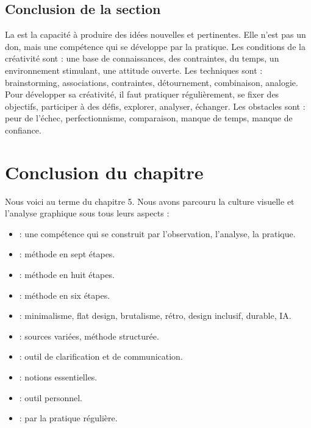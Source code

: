 \subsection*{Conclusion de la section}

\begin{retenir}
La  est la capacité à produire des idées nouvelles et pertinentes. Elle n'est pas un don, mais une compétence qui se développe par la pratique. Les conditions de la créativité sont : une base de connaissances, des contraintes, du temps, un environnement stimulant, une attitude ouverte. Les techniques sont : brainstorming, associations, contraintes, détournement, combinaison, analogie. Pour développer sa créativité, il faut pratiquer régulièrement, se fixer des objectifs, participer à des défis, explorer, analyser, échanger. Les obstacles sont : peur de l'échec, perfectionnisme, comparaison, manque de temps, manque de confiance.
\end{retenir}

\section*{Conclusion du chapitre}

Nous voici au terme du chapitre 5. Nous avons parcouru la culture visuelle et l'analyse graphique sous tous leurs aspects :

\begin{itemize}
    \item {} : une compétence qui se construit par l'observation, l'analyse, la pratique.
    \item {} : méthode en sept étapes.
    \item {} : méthode en huit étapes.
    \item {} : méthode en six étapes.
    \item {} : minimalisme, flat design, brutalisme, rétro, design inclusif, durable, IA.
    \item {} : sources variées, méthode structurée.
    \item {} : outil de clarification et de communication.
    \item {} : notions essentielles.
    \item {} : outil personnel.
    \item {} : par la pratique régulière.
\end{itemize}

